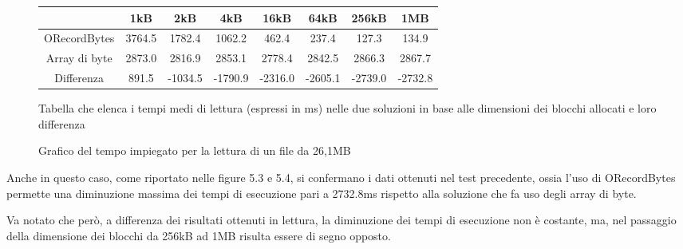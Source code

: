 \begin{figure}[t]
\centering
\begin{tabular}{cccccccc}
\toprule
\textbf{} & \textbf{1kB} & \textbf{2kB} & \textbf{4kB} & \textbf{16kB} & \textbf{64kB} & \textbf{256kB} & \textbf{1MB}\\
\midrule
ORecordBytes & 3764.5 & 1782.4 & 1062.2 & 462.4 & 237.4 & 127.3 & 134.9 \\
Array di byte & 2873.0 & 2816.9 & 2853.1 & 2778.4 & 2842.5 & 2866.3 & 2867.7\\
Differenza & 891.5 & -1034.5 & -1790.9 & -2316.0 & -2605.1 & -2739.0 & -2732.8\\
\bottomrule
\end{tabular}
\caption{Tabella che elenca i tempi medi di lettura (espressi in ms) nelle due soluzioni in base alle dimensioni dei blocchi allocati e loro differenza}
\label{:}
\end{figure}
\begin{figure}
\centering
{}
\caption{Grafico del tempo impiegato per la lettura di un file da 26,1MB}
\label{:}
\end{figure}

Anche in questo caso, come riportato nelle figure 5.3 e 5.4, si confermano i dati ottenuti nel test precedente, ossia l'uso di ORecordBytes permette una diminuzione massima dei tempi di esecuzione pari a 2732.8ms rispetto alla soluzione che fa uso degli array di byte.

Va notato che però, a differenza dei risultati ottenuti in lettura, la diminuzione dei tempi di esecuzione non è costante, ma, nel passaggio della dimensione dei blocchi da 256kB ad 1MB risulta essere di segno opposto.


